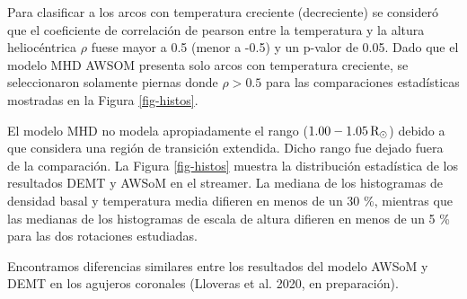 \documentclass[baaa]{baaa}
\begin{document}

Para clasificar a los arcos con temperatura creciente (decreciente) se consideró que el coeficiente de correlación de pearson entre la temperatura y la altura heliocéntrica $\rho$ fuese mayor a 0.5 (menor a -0.5) y un p-valor de 0.05. Dado que el modelo MHD AWSOM presenta solo arcos con temperatura creciente, se seleccionaron solamente piernas donde $\rho> 0.5$ para las comparaciones estadísticas mostradas en la Figura \ref{fig-histos}.  


El modelo MHD no modela apropiadamente el rango ($1.00 - 1.05\,{\rm R_\odot}$) debido a que considera una región de transición extendida. Dicho rango fue dejado fuera de la comparación. La Figura \ref{fig-histos} muestra la distribución estadística de los resultados DEMT y AWSoM en el streamer. La mediana de los histogramas de densidad basal y temperatura media difieren en menos de un 30 \%, mientras que las medianas de los histogramas de escala de altura difieren en menos de un 5 \% para las dos rotaciones estudiadas.

Encontramos diferencias similares entre los resultados  del modelo AWSoM y DEMT en los agujeros coronales  (Lloveras et al. 2020, en preparación).
\end{document}
